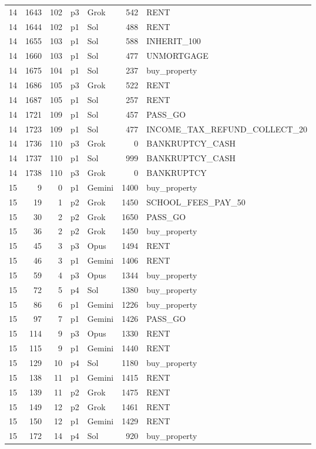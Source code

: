 \begin{longtable}{r r r l l r >{\ttfamily}l}
14 & 1643 & 102 & p3 & Grok & 542 & RENT \\
14 & 1644 & 102 & p1 & Sol & 488 & RENT \\
14 & 1655 & 103 & p1 & Sol & 588 & INHERIT\_100 \\
14 & 1660 & 103 & p1 & Sol & 477 & UNMORTGAGE \\
14 & 1675 & 104 & p1 & Sol & 237 & buy\_property \\
14 & 1686 & 105 & p3 & Grok & 522 & RENT \\
14 & 1687 & 105 & p1 & Sol & 257 & RENT \\
14 & 1721 & 109 & p1 & Sol & 457 & PASS\_GO \\
14 & 1723 & 109 & p1 & Sol & 477 & INCOME\_TAX\_REFUND\_COLLECT\_20 \\
14 & 1736 & 110 & p3 & Grok & 0 & BANKRUPTCY\_CASH \\
14 & 1737 & 110 & p1 & Sol & 999 & BANKRUPTCY\_CASH \\
14 & 1738 & 110 & p3 & Grok & 0 & BANKRUPTCY \\
15 & 9 & 0 & p1 & Gemini & 1400 & buy\_property \\
15 & 19 & 1 & p2 & Grok & 1450 & SCHOOL\_FEES\_PAY\_50 \\
15 & 30 & 2 & p2 & Grok & 1650 & PASS\_GO \\
15 & 36 & 2 & p2 & Grok & 1450 & buy\_property \\
15 & 45 & 3 & p3 & Opus & 1494 & RENT \\
15 & 46 & 3 & p1 & Gemini & 1406 & RENT \\
15 & 59 & 4 & p3 & Opus & 1344 & buy\_property \\
15 & 72 & 5 & p4 & Sol & 1380 & buy\_property \\
15 & 86 & 6 & p1 & Gemini & 1226 & buy\_property \\
15 & 97 & 7 & p1 & Gemini & 1426 & PASS\_GO \\
15 & 114 & 9 & p3 & Opus & 1330 & RENT \\
15 & 115 & 9 & p1 & Gemini & 1440 & RENT \\
15 & 129 & 10 & p4 & Sol & 1180 & buy\_property \\
15 & 138 & 11 & p1 & Gemini & 1415 & RENT \\
15 & 139 & 11 & p2 & Grok & 1475 & RENT \\
15 & 149 & 12 & p2 & Grok & 1461 & RENT \\
15 & 150 & 12 & p1 & Gemini & 1429 & RENT \\
15 & 172 & 14 & p4 & Sol & 920 & buy\_property \\

\end{longtable}
